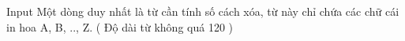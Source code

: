 Input
Một dòng duy nhất là từ cần tính số cách xóa, từ này chỉ chứa các chữ cái in hoa A, B, .., Z. ( Độ dài từ không quá 120 )